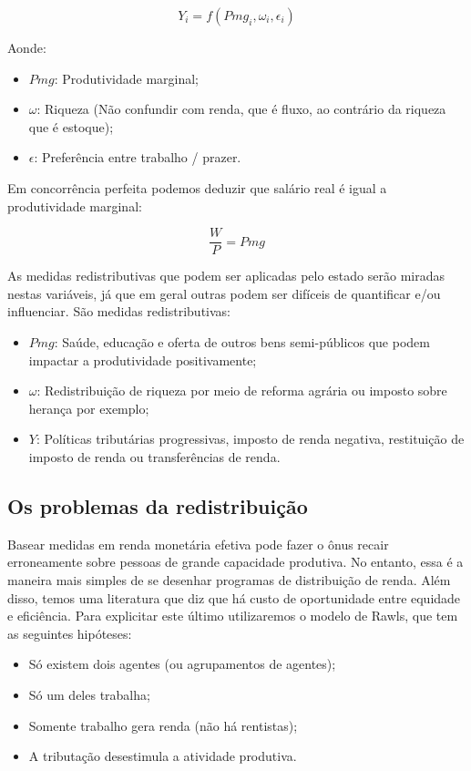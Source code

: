 \documentclass[12pt,a4paper,oneside,brazil]{abntex2}
\begin{document}
\[ Y_i = f(Pmg_i, \omega_i, \epsilon_i) \] 

Aonde:
\begin{itemize}
\item $Pmg$: Produtividade marginal;
\item $\omega$: Riqueza (Não confundir com renda, que é fluxo, ao contrário da riqueza que é estoque);
\item $\epsilon$: Preferência entre trabalho / prazer.
\end{itemize}

Em concorrência perfeita podemos deduzir que salário real é igual a produtividade marginal:

\[ \frac{W}{P} = Pmg\]

As medidas redistributivas que podem ser aplicadas pelo estado serão miradas nestas variáveis, já que em geral outras podem ser difíceis de quantificar e/ou influenciar. São medidas redistributivas:

\begin{itemize}
\item $Pmg$: Saúde, educação e oferta de outros bens semi-públicos que podem impactar a produtividade positivamente;
\item $\omega$: Redistribuição de riqueza por meio de reforma agrária ou imposto sobre herança por exemplo;
\item $Y$: Políticas tributárias progressivas, imposto de renda negativa, restituição de imposto de renda ou transferências de renda.
\end{itemize}

\subsection{Os problemas da redistribuição}

Basear medidas em renda monetária efetiva pode fazer o ônus recair erroneamente sobre pessoas de grande capacidade produtiva. No entanto, essa é a maneira mais simples de se desenhar programas de distribuição de renda. Além disso, temos uma literatura que diz que há custo de oportunidade entre equidade e eficiência. Para explicitar este último utilizaremos o modelo de Rawls, que tem as seguintes hipóteses:

\begin{itemize}
\item Só existem dois agentes (ou agrupamentos de agentes);
\item Só um deles trabalha;
\item Somente trabalho gera renda (não há rentistas);
\item A tributação desestimula a atividade produtiva.
\end{itemize}
\end{document}
